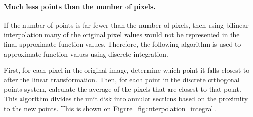 \paragraph{Much less points than the number of pixels.}
If the number of points is far fewer than the number of pixels, then using bilinear interpolation many of the original pixel values would not be represented in the final approximate function values. Therefore, the following algorithm is used to approximate function values using discrete integration.

First, for each pixel in the original image, determine which point it falls closest to after the linear transformation. Then, for each point in the discrete orthogonal points system, calculate the average of the pixels that are closest to that point. This algorithm divides the unit disk into annular sections based on the proximity to the new points. This is shown on Figure~\ref{fig:interpolation_integral}.


